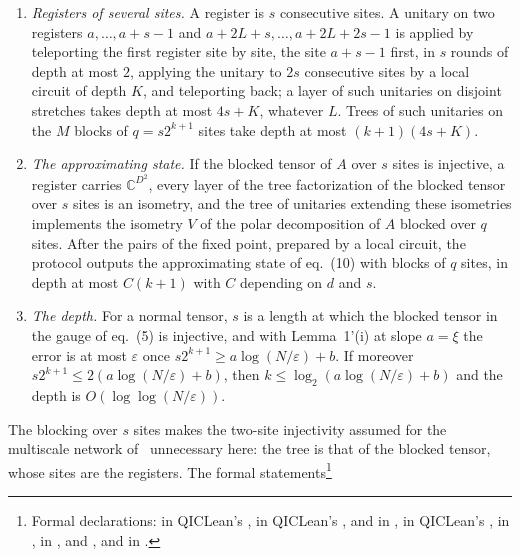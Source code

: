 \documentclass{article}
\begin{document}
\begin{enumerate}
    \item \emph{Registers of several sites.} A register is $s$ consecutive
          sites. A unitary on two registers $a,\dots,a+s-1$ and
          $a+2L+s,\dots,a+2L+2s-1$ is applied by teleporting the first register
          site by site, the site $a+s-1$ first, in $s$ rounds of depth at most
          $2$, applying the unitary to $2s$ consecutive sites by a local circuit
          of depth $K$, and teleporting back; a layer of such unitaries on
          disjoint stretches takes depth at most $4s+K$, whatever $L$. Trees of
          such unitaries on the $M$ blocks of $q=s2^{k+1}$ sites take depth at
          most $(k+1)(4s+K)$.
    \item \emph{The approximating state.} If the blocked tensor of $A$ over $s$
          sites is injective, a register carries $\mathbb{C}^{D^2}$, every layer
          of the tree factorization of the blocked tensor over $s$ sites is an
          isometry, and the tree of unitaries extending these isometries
          implements the isometry $V$ of the polar decomposition of $A$ blocked
          over $q$ sites. After the pairs of the fixed point, prepared by a local
          circuit, the protocol outputs the approximating state of eq.~(10) with
          blocks of $q$ sites, in depth at most $C(k+1)$ with $C$ depending on $d$
          and $s$.
    \item \emph{The depth.} For a normal tensor, $s$ is a length at which the
          blocked tensor in the gauge of eq.~(5) is injective, and with
          Lemma~1'(i) at slope $a=\xi$ the error is at most $\varepsilon$ once
          $s2^{k+1}\ge a\log(N/\varepsilon)+b$. If moreover
          $s2^{k+1}\le2(a\log(N/\varepsilon)+b)$, then
          $k\le\log_2(a\log(N/\varepsilon)+b)$ and the depth is
          $O(\log\log(N/\varepsilon))$.
\end{enumerate}
The blocking over $s$ sites makes the two-site injectivity assumed for the
multiscale network of~\cite{gap:mswc24_tree_mera_scope} unnecessary here: the
tree is that of the blocked tensor, whose sites are the registers.
The formal statements\footnote{Formal declarations:
     in QICLean's
    ,
     in QICLean's
    , and
     in
    ,
     in QICLean's
    ,
     in
    ,
     in
    , and
    ,
    and
    in .}
\end{document}
